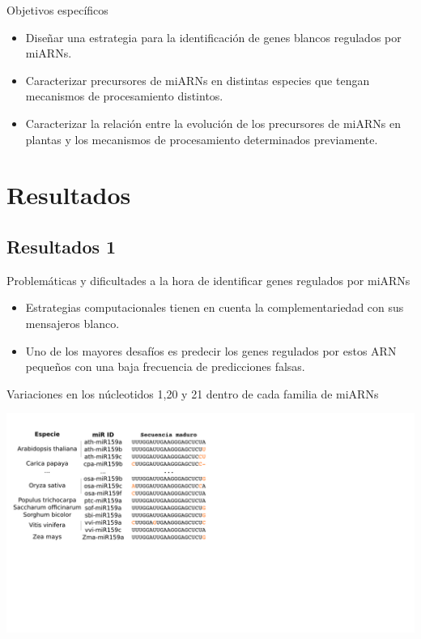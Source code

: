 \documentclass{beamer}
\begin{document}
\begin{frame}{Objetivos específicos}
		\pause
		\begin{itemize}
            \item<-2> Diseñar una estrategia para la identificación de genes blancos regulados por miARNs.
			\item<-1> Caracterizar precursores de miARNs en distintas especies que tengan mecanismos de procesamiento distintos.
			\item<-1> Caracterizar la relación entre la evolución de los precursores de miARNs en plantas y los mecanismos de procesamiento determinados previamente.
        \end{itemize}
\end{frame}


\section{Resultados}

\subsection{Resultados 1}



\begin{frame}{Problemáticas y dificultades a la hora de identificar genes regulados por miARNs}
	\begin{itemize}
		\item Estrategias computacionales tienen en cuenta la complementariedad con sus mensajeros blanco.
        \item Uno de los mayores desafíos es predecir los genes regulados por estos ARN pequeños con una baja frecuencia de predicciones falsas.
	\end{itemize}
\end{frame}

\begin{frame}{Variaciones en los núcleotidos 1,20 y 21 dentro de cada familia de miARNs}
    \begin{center}
        {\includegraphics[width=1\textwidth]{img/variacion00.png}}
    \end{center}
\end{frame}
\end{document}
